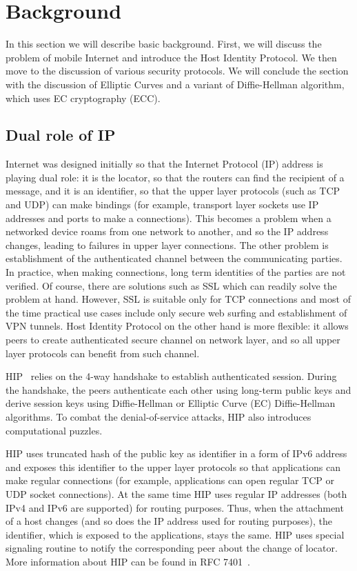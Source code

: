 \section{Background}
\label{section:background}

In this section we will describe basic background. First, we will
discuss the problem of mobile Internet and introduce the Host Identity
Protocol. We then move to the discussion of various security protocols.
We will conclude the section with the discussion of Elliptic Curves and
a variant of Diffie-Hellman algorithm, which uses EC cryptography (ECC).

\subsection{Dual role of IP}

Internet was designed initially so that the Internet Protocol (IP)
address is playing dual role: it is the locator, so that the 
routers can find the recipient of a message, and it is an identifier, so that 
the upper layer protocols (such as TCP and UDP) can make bindings 
(for example, transport layer sockets use IP addresses and ports 
to make a connections). This becomes a problem when a networked 
device roams from one network to another, and so the IP address changes, 
leading to failures in upper layer connections. The other problem is
establishment of the authenticated channel between the communicating
parties. In practice, when making connections, long term identities 
of the parties are not verified. Of course, there are solutions such 
as SSL which can readily solve the problem at hand.
However, SSL is suitable only for TCP connections and most of the 
time practical use cases include only secure web surfing and 
establishment of VPN tunnels. Host Identity Protocol on the 
other hand is more flexible: it allows peers to create authenticated secure 
channel on network layer, and so all upper layer protocols can
benefit from such channel.

HIP~\cite{hip} relies on the 4-way handshake to establish
authenticated session. During the handshake, the peers authenticate
each other using long-term public keys and derive session keys 
using Diffie-Hellman or Elliptic Curve (EC) Diffie-Hellman algorithms.
To combat the denial-of-service attacks, HIP also introduces computational 
puzzles.

HIP uses truncated hash of the public key as identifier in a form of IPv6 address 
and exposes this identifier to the upper layer protocols so that applications can make 
regular connections (for example, applications can open regular TCP or UDP socket connections). 
At the same time HIP uses regular IP addresses (both IPv4 and IPv6 are supported) for routing purposes. 
Thus, when the attachment of a host changes (and so does the IP address used 
for routing purposes), the identifier, which is exposed to the applications, stays the same.
HIP uses special signaling routine to notify the corresponding peer about the 
change of locator. More information about HIP can be found in
RFC 7401~\cite{rfc7401}.


